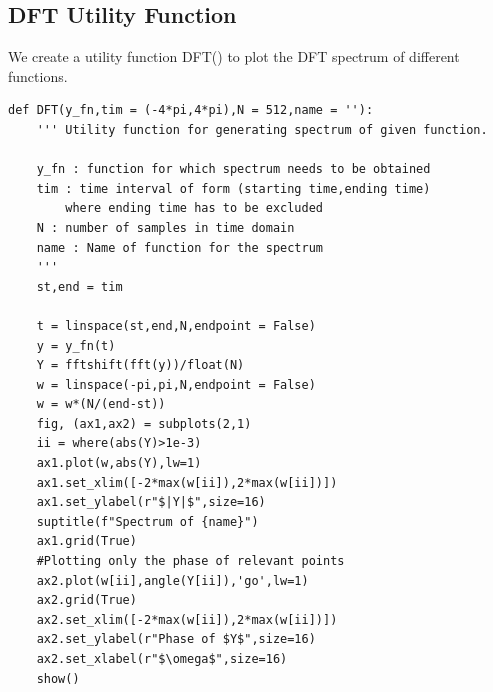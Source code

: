 \documentclass[11pt, a4paper]{article}
\begin{document}
\subsection{DFT Utility Function}
{
We create a utility function DFT() to plot the DFT spectrum of different functions.
}
\begin{verbatim}
def DFT(y_fn,tim = (-4*pi,4*pi),N = 512,name = ''):
	''' Utility function for generating spectrum of given function.

	y_fn : function for which spectrum needs to be obtained
	tim : time interval of form (starting time,ending time) 
		where ending time has to be excluded
	N : number of samples in time domain
	name : Name of function for the spectrum
	'''
	st,end = tim

	t = linspace(st,end,N,endpoint = False)
	y = y_fn(t)
	Y = fftshift(fft(y))/float(N)
	w = linspace(-pi,pi,N,endpoint = False)
	w = w*(N/(end-st))
	fig, (ax1,ax2) = subplots(2,1)
	ii = where(abs(Y)>1e-3)
	ax1.plot(w,abs(Y),lw=1)
	ax1.set_xlim([-2*max(w[ii]),2*max(w[ii])])
	ax1.set_ylabel(r"$|Y|$",size=16)
	suptitle(f"Spectrum of {name}")
	ax1.grid(True)
	#Plotting only the phase of relevant points
	ax2.plot(w[ii],angle(Y[ii]),'go',lw=1)  
	ax2.grid(True)
	ax2.set_xlim([-2*max(w[ii]),2*max(w[ii])])
	ax2.set_ylabel(r"Phase of $Y$",size=16)
	ax2.set_xlabel(r"$\omega$",size=16)
	show()
\end{verbatim}
\end{document}
